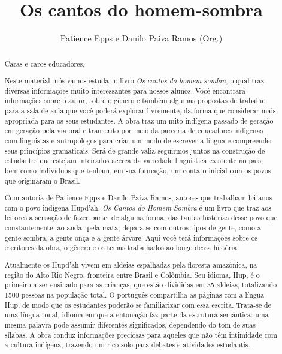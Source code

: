 \documentclass[11pt]{extarticle}
\newcommand{\AutorLivro}{Patience Epps e Danilo Paiva Ramos (Org.)}
\newcommand{\TituloLivro}{Os cantos do homem-sombra}
\newcommand{\colaborador}{Gabriela Karam}
\begin{document}
\title{\TituloLivro}
\author{\AutorLivro}
\def\authornotes{\colaborador}

\date{}
\maketitle


\tableofcontents


\begin{abstract}

Caras e caros educadores,

Neste material, nós vamos estudar o livro \textit{Os cantos do homem-sombra}, o qual traz diversas informações muito interessantes para nossos alunos. Você encontrará informações sobre o autor, sobre o gênero e também algumas propostas de trabalho para a sala de aula que você poderá explorar livremente, da forma que considerar mais apropriada para os seus estudantes. A obra traz um mito indígena passado de geração em geração pela via oral e transcrito por meio da parceria de educadores indígenas com linguistas e antropólogos para criar um modo de escrever a língua e compreender seus princípios gramaticais. Será de grande valia seguirmos juntos na construção de estudantes que estejam inteirados acerca da variedade linguística existente no país, bem como indivíduos que tenham, em sua formação, um contato inicial com os povos que originaram o Brasil.

Com autoria de Patience Epps e Danilo Paiva Ramos, autores que trabalham há anos com o povo indígena Hupd'äh, \textit{Os Cantos do Homem-Sombra} é um livro que traz aos leitores a sensação de fazer parte, de alguma forma, das tantas histórias desse povo que constantemente, ao andar pela mata, depara-se com outros tipos de gente, como a gente-sombra, a gente-onça e a gente-árvore. Aqui você terá informações sobre os escritores da obra, o gênero e os temas trabalhados ao longo dessa história. 

Atualmente os Hupd'äh vivem em aldeias espalhadas pela floresta amazônica, na região do Alto Rio Negro, fronteira entre Brasil e Colômbia. Seu idioma, Hup, é o primeiro a ser ensinado para as crianças, que estão divididas em 35 aldeias, totalizando 1500 pessoas na população total. O português compartilha as páginas com a língua Hup, de modo que os estudantes poderão se familiarizar com essa escrita. Trata-se de uma língua tonal, idioma em que a entonação faz parte da estrutura semântica: uma mesma palavra pode assumir diferentes significados, dependendo do tom de suas sílabas. A obra conduz informações preciosas para aqueles que não têm intimidade com a cultura indígena, trazendo um rico solo para debates e atividades estudantis.


\end{abstract}
\end{document}

